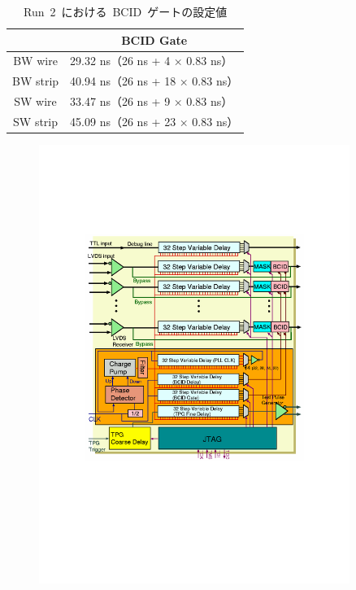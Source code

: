 \begin{table}[tbp]
	\centering
	\begin{tabular}{c|l}\hline
	& \multicolumn{1}{c}{BCID Gate} \\ \hline
	BW wire & 29.32 ns（26 ns + 4 × 0.83 ns）\\
	BW strip & 40.94 ns（26 ns + 18 × 0.83 ns）\\
	SW wire & 33.47 ns（26 ns + 9 × 0.83 ns）\\
	SW strip & 45.09 ns（26 ns + 23 × 0.83 ns）\\
	\end{tabular}
	\caption{Run~2~における~BCID~ゲートの設定値}
	\label{tb:BCIDGate}
\end{table}

\begin{figure}[H]
		\begin{minipage}{0.49\hsize}
		\centering
        \includegraphics[width=0.9\textwidth,page=3]{img/pdf/PP.pdf}
        \subcaption{}
        \end{minipage}
        \begin{minipage}{0.49\hsize}

\end{minipage}
\end{figure}
